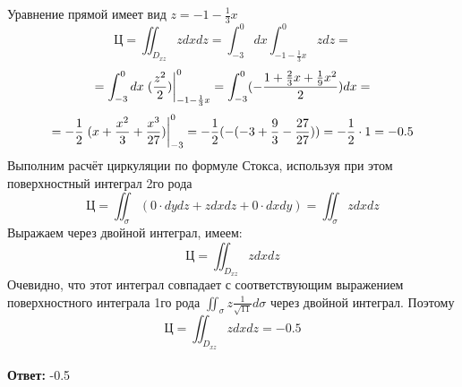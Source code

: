 \documentclass[11pt]{article}
\begin{document}
Уравнение прямой имеет вид $z = -1 - \frac{1}{3}x$
\[\text{Ц} = \iint_{D_{xz}}zdxdz = \int_{-3}^0dx\int_{-1-\frac{1}{3}x}^0zdz = \]
\[ =\int_{-3}^0dx\eval{(\frac{z^2}{2})}_{-1-\frac{1}{3}x}^0 = \int_{-3}^0(-\frac{1 + \frac{2}{3}x + \frac{1}{9}x^2}{2})dx = \]
\[= -\frac{1}{2}\eval{(x + \frac{x^2}{3} + \frac{x^3}{27})}_{-3}^0 = -\frac{1}{2}(-(-3 + \frac{9}{3} - \frac{27}{27})) = -\frac{1}{2}\cdot 1 = -0.5\]
Выполним расчёт циркуляции по формуле Стокса, используя при этом поверхностный интеграл 2го рода
\[\text{Ц} = \iint_\sigma (0\cdot dydz + zdxdz + 0\cdot dxdy) = \iint_\sigma zdxdz\]
Выражаем через двойной интеграл, имеем:
\[\text{Ц} = \iint_{D_{xz}} zdxdz\]
Очевидно, что этот интеграл совпадает с соответствующим выражением поверхностного интеграла 1го рода $\iint_\sigma z\frac{1}{\sqrt{11}}d\sigma$ через двойной интеграл. Поэтому
\[\text{Ц} = \iint_{D_{xz}}zdxdz = - 0.5\]\\
\textbf{Ответ:} -0.5
\end{document}
